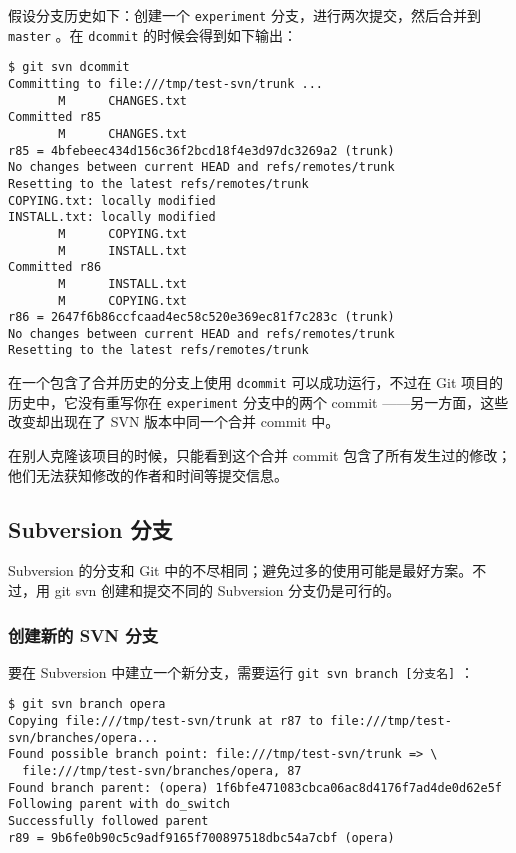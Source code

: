 \documentclass[a4paper]{book}
\begin{document}
假设分支历史如下：创建一个 \texttt{experiment} 分支，进行两次提交，然后合并到 \texttt{master} 。在 \texttt{dcommit} 的时候会得到如下输出：

\begin{shaded}\begin{verbatim}
$ git svn dcommit
Committing to file:///tmp/test-svn/trunk ...
       M      CHANGES.txt
Committed r85
       M      CHANGES.txt
r85 = 4bfebeec434d156c36f2bcd18f4e3d97dc3269a2 (trunk)
No changes between current HEAD and refs/remotes/trunk
Resetting to the latest refs/remotes/trunk
COPYING.txt: locally modified
INSTALL.txt: locally modified
       M      COPYING.txt
       M      INSTALL.txt
Committed r86
       M      INSTALL.txt
       M      COPYING.txt
r86 = 2647f6b86ccfcaad4ec58c520e369ec81f7c283c (trunk)
No changes between current HEAD and refs/remotes/trunk
Resetting to the latest refs/remotes/trunk
\end{verbatim}\end{shaded}

在一个包含了合并历史的分支上使用 \texttt{dcommit} 可以成功运行，不过在 Git 项目的历史中，它没有重写你在 \texttt{experiment} 分支中的两个 commit ------另一方面，这些改变却出现在了 SVN 版本中同一个合并 commit 中。

在别人克隆该项目的时候，只能看到这个合并 commit 包含了所有发生过的修改；他们无法获知修改的作者和时间等提交信息。

\subsection{Subversion 分支}

Subversion 的分支和 Git 中的不尽相同；避免过多的使用可能是最好方案。不过，用 git svn 创建和提交不同的 Subversion 分支仍是可行的。

\subsubsection{创建新的 SVN 分支}

要在 Subversion 中建立一个新分支，需要运行 \texttt{git svn branch {[}分支名{]}} ：

\begin{shaded}\begin{verbatim}
$ git svn branch opera
Copying file:///tmp/test-svn/trunk at r87 to file:///tmp/test-svn/branches/opera...
Found possible branch point: file:///tmp/test-svn/trunk => \
  file:///tmp/test-svn/branches/opera, 87
Found branch parent: (opera) 1f6bfe471083cbca06ac8d4176f7ad4de0d62e5f
Following parent with do_switch
Successfully followed parent
r89 = 9b6fe0b90c5c9adf9165f700897518dbc54a7cbf (opera)
\end{verbatim}\end{shaded}
\end{document}
